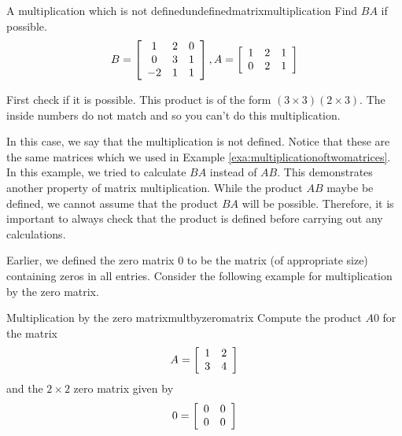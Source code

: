 \begin{example}{A multiplication which is not defined}{undefinedmatrixmultiplication}
Find $BA$ if possible.
\begin{equation*}
B = \left[
\begin{array}{ccc}
1 & 2 & 0 \\
0 & 3 & 1 \\
-2 & 1 & 1
\end{array}
\right],  A = \left[
\begin{array}{ccc}
1 & 2 & 1 \\
0 & 2 & 1
\end{array}
\right]
\end{equation*}
\end{example}

\begin{solution} First check if it is possible. This product is of the form $\left( 3\times 3\right)
\left( 2\times 3\right) .$ The inside numbers do not match and so you can't
do this multiplication. 
\end{solution}

In this case, we say that the multiplication is not defined. 
Notice that these are the same matrices which we used in Example \ref{exa:multiplicationoftwomatrices}.
In this example, we tried to calculate $BA$ instead of $AB$. This demonstrates another property 
of matrix multiplication. While the product $AB$ maybe be defined, we cannot assume that
the product $BA$ will be possible. Therefore, it is important to always check that the product is defined
before carrying out any calculations.

Earlier, we defined the zero matrix $0$ to be the matrix (of
appropriate size) containing zeros in all entries.  Consider the
following example for multiplication by the zero matrix.

\begin{example}{Multiplication by the zero matrix}{multbyzeromatrix}
Compute the product $A0$ for the matrix
\begin{equation*}
A=
\left[
\begin{array}{rr}
1 & 2 \\
3 & 4
\end{array}
\right]
\end{equation*}
and the $2 \times 2$ zero matrix given by
\begin{equation*}
0=
\left[
\begin{array}{rr}
0 & 0 \\
0 & 0
\end{array}
\right]
\end{equation*}
\end{example}

